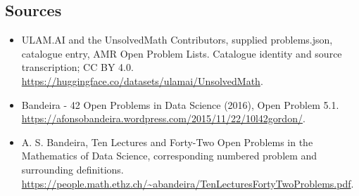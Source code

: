 \documentclass[11pt,a4paper]{article}
\begin{document}
\subsection{Sources}
\begin{itemize}
\item[S1] ULAM.AI and the UnsolvedMath Contributors, supplied problems.json, catalogue entry, AMR Open Problem Lists. Catalogue identity and source transcription; CC BY 4.0.
\url{https://huggingface.co/datasets/ulamai/UnsolvedMath}.
\item[S2] Bandeira - 42 Open Problems in Data Science (2016), Open Problem 5.1. 
\url{https://afonsobandeira.wordpress.com/2015/11/22/10l42gordon/}.
\item[S3] A. S. Bandeira, Ten Lectures and Forty-Two Open Problems in the Mathematics of Data Science, corresponding numbered problem and surrounding definitions.
\url{https://people.math.ethz.ch/~abandeira/TenLecturesFortyTwoProblems.pdf}.
\end{itemize}
\end{document}
